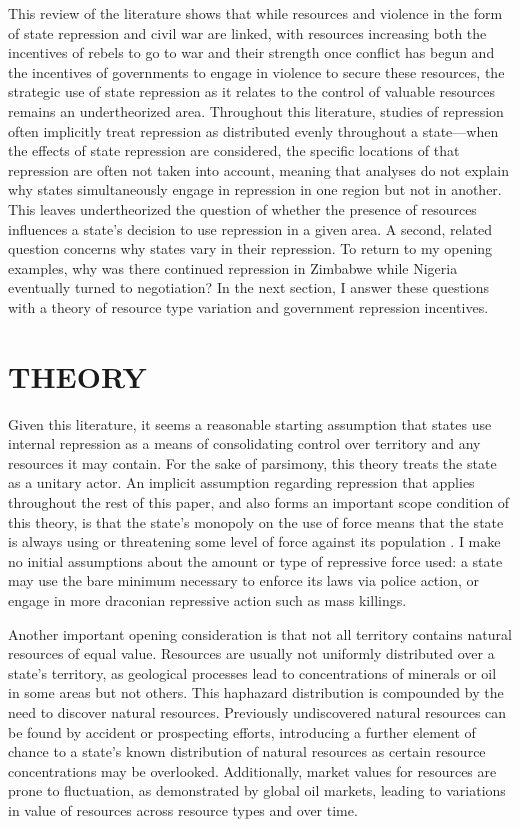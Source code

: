 This review of the literature shows that while resources and violence in the form of state repression and civil war are linked, with resources increasing both the incentives of rebels to go to war and their strength once conflict has begun and the incentives of governments to engage in violence to secure these resources, the strategic use of state repression as it relates to the control of valuable resources remains an undertheorized area. Throughout this literature, studies of repression often implicitly treat repression as distributed evenly throughout a state—when the effects of state repression are considered, the specific locations of that repression are often not taken into account, meaning that analyses do not explain why states simultaneously engage in repression in one region but not in another. This leaves undertheorized the question of whether the presence of resources influences a state’s decision to use repression in a given area. A second, related question concerns why states vary in their repression. To return to my opening examples, why was there continued repression in Zimbabwe while Nigeria eventually turned to negotiation? In the next section, I answer these questions with a theory of resource type variation and government repression incentives.

\newpage
\vspace*{25pt}
\section*{\normalfont \hfill THEORY \hfill}

Given this literature, it seems a reasonable starting assumption that states use internal repression as a means of consolidating control over territory and any resources it may contain. For the sake of parsimony, this theory treats the state as a unitary actor. An implicit assumption regarding repression that applies throughout the rest of this paper, and also forms an important scope condition of this theory, is that the state's monopoly on the use of force means that the state is always using or threatening some level of force against its population \cite{tilly1975}. I make no initial assumptions about the amount or type of repressive force used: a state may use the bare minimum necessary to enforce its laws via police action, or engage in more draconian repressive action such as mass killings.

Another important opening consideration is that not all territory contains natural resources of equal value. Resources are usually not uniformly distributed over a state’s territory, as geological processes lead to concentrations of minerals or oil in some areas but not others. This haphazard distribution is compounded by the need to discover natural resources. Previously undiscovered natural resources can be found by accident or prospecting efforts, introducing a further element of chance to a state’s known distribution of natural resources as certain resource concentrations may be overlooked. Additionally, market values for resources are prone to fluctuation, as demonstrated by global oil markets, leading to variations in value of resources across resource types and over time. 

